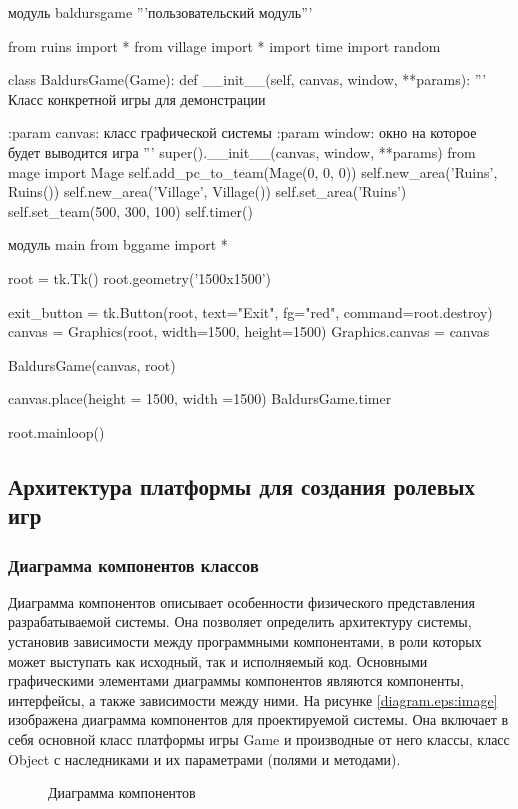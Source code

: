 модуль baldursgame '''пользовательский модуль'''

from ruins import *
from village import *
import time
import random

class BaldursGame(Game):
def \_\_init\_\_(self, canvas, window, **params):
'''
Класс конкретной игры для демонстрации

:param canvas: класс графической системы
:param window: окно на которое будет выводится игра
'''
super().\_\_init\_\_(canvas, window, **params)
from mage import Mage
self.add\_pc\_to\_team(Mage(0, 0, 0))
self.new\_area('Ruins', Ruins())
self.new\_area('Village', Village())
self.set\_area('Ruins')
self.set\_team(500, 300, 100)
self.timer()

модуль main
from bggame import *

root = tk.Tk()
root.geometry('1500x1500')

exit\_button = tk.Button(root, text="Exit", fg="red", command=root.destroy)
canvas = Graphics(root, width=1500, height=1500)
Graphics.canvas = canvas

BaldursGame(canvas, root)

canvas.place(height = 1500, width =1500)
BaldursGame.timer

root.mainloop()

\subsection{Архитектура платформы для создания ролевых игр}
\subsubsection{Диаграмма компонентов классов}
Диаграмма компонентов описывает особенности физического представления разрабатываемой системы. Она позволяет определить архитектуру системы, установив зависимости между программными компонентами, в роли которых может выступать как исходный, так и исполняемый код. Основными графическими элементами диаграммы компонентов являются компоненты, интерфейсы, а также зависимости между ними. На рисунке \ref{diagram.eps:image} изображена диаграмма компонентов для проектируемой системы. Она включает в себя основной класс платформы игры Game и производные от него классы, класс Object с наследниками и их параметрами (полями и методами).
\begin{figure}[ht]
	\caption{Диаграмма компонентов}
	\label{diagram:image}
\end{figure}
